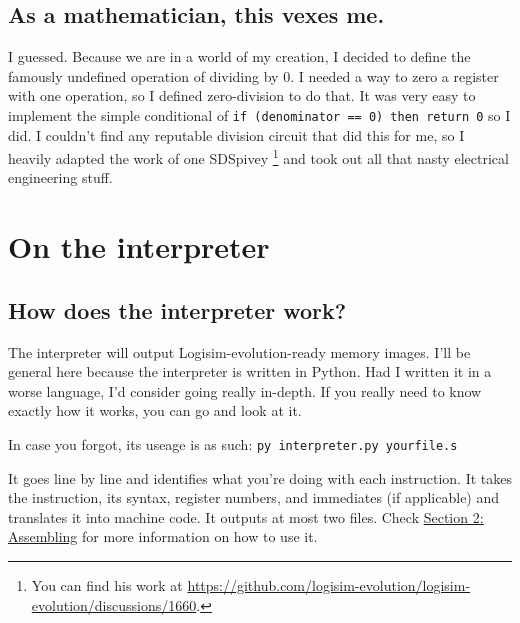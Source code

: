 \documentclass[12pt, oneside]{memoir}
\begin{document}
\section{As a mathematician, this vexes me.}
I guessed. Because we are in a world of my creation, I decided to define the famously undefined operation of dividing by 0. I needed a way to zero a register with one operation, so I defined zero-division to do that. It was very easy to implement the simple conditional of \texttt{if (denominator == 0) then return 0} so I did. I couldn't find any reputable division circuit that did this for me, so I heavily adapted the work of one SDSpivey
\footnote{You can find his work at \href{https://github.com/logisim-evolution/logisim-evolution/discussions/1660}{https://github.com/logisim-evolution/logisim-evolution/discussions/1660}.} 
and took out all that nasty electrical engineering stuff.


\chapter{On the interpreter}
\section{How does the interpreter work?} 
The interpreter will output Logisim-evolution-ready memory images. I'll be general here because the interpreter is written in Python. Had I written it in a worse language, I'd consider going really in-depth. If you really need to know exactly how it works, you can go and look at it.

In case you forgot, its useage is as such: \texttt{py interpreter.py yourfile.s}

It goes line by line and identifies what you're doing with each instruction. It takes the instruction, its syntax, register numbers, and immediates (if applicable) and translates it into machine code. It outputs at most two files. Check \hyperref[s2]{Section 2: Assembling} for more information on how to use it.
\end{document}
